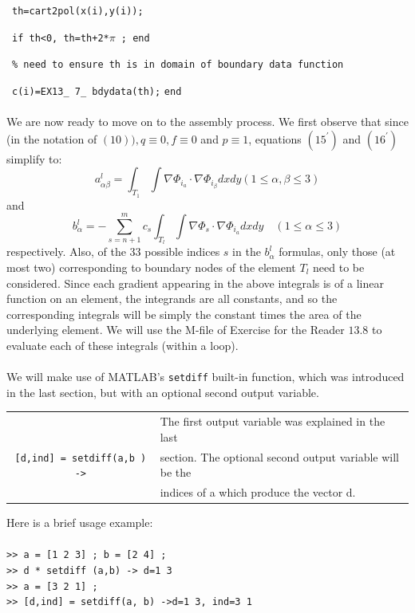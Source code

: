 \documentclass[../main.tex]{subfiles}
\begin{document}
~\texttt{th=cart2pol(x(i),y(i)); 
}

~\texttt{if th<0, th=th+2*$\pi$ ; end}

~\texttt{\% need to ensure th is in domain of boundary data function}

~\texttt{c(i)=EX13\_ 7\_ bdydata(th);}
\texttt{end}
\\
\\
We are now ready to move on to the assembly process. We first observe that since (in the notation of $(10)), q \equiv 0, f \equiv 0$ and $p \equiv 1$, equations $\left(15^{\prime}\right)$ and $(16^{\prime})$ simplify to:
$$
a_{\alpha \beta}^{l}=\int_{T_{1}}\int \nabla \Phi_{i_{a}} \cdot \nabla \Phi_{i_{\beta}} d x d y(1 \leq \alpha, \beta \leq 3)
$$
and
$$
b_{\alpha}^{l}=-\sum_{s=n+1}^{m} c_{s} \int_{T_{l}}\int \nabla \Phi_{s} \cdot \nabla \Phi_{i_{a}} d x d y \quad(1 \leq \alpha \leq 3)
$$
respectively. Also, of the 33 possible indices $s$ in the $b_{\alpha}^{l}$ formulas, only those (at most two) corresponding to boundary nodes of the element $T_{l}$ need to be considered. Since each gradient appearing in the above integrals is of a linear function on an element, the integrands are all constants, and so the corresponding integrals will be simply the constant times the area of the underlying element. We will use the M-file of Exercise for the Reader $13.8$ to evaluate each of these integrals (within a loop).
\\
\\
We will make use of MATLAB's \texttt{setdiff} built-in function, which was introduced in the last section, but with an optional second output variable.
\begin{center}
\begin{tabular}{|c|l|}
\hline
&The first output variable was explained in the last\\
\texttt{[d,ind] = setdiff(a,b ) ->}&section. The optional second output variable will be the\\
&indices of a which produce the vector d.\\
\hline
\end{tabular}
\end{center}
Here is a brief usage example: 
\\
\\
\texttt{>> a = [1 2 3] ; b = [2 4] ;}\\
\texttt{>> d * setdiff (a,b) -> d=1 3}\\
\texttt{>> a = [3 2 1] ;}\\
\texttt{>> [d,ind] = setdiff(a, b) ->d=1 3, ind=3 1}\\
\end{document}
